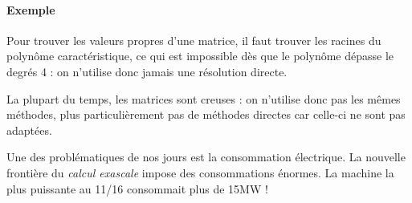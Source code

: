 \documentclass{article}
\begin{document}
\paragraph{Exemple} Pour trouver les valeurs propres d'une matrice, il faut trouver les racines du polynôme caractéristique, ce qui est impossible dès que le polynôme dépasse le degrés 4 : on n'utilise donc jamais une résolution directe.
\bigskip

La plupart du temps, les matrices sont creuses : on n'utilise donc pas les mêmes méthodes, plus particulièrement pas de méthodes directes car celle-ci ne sont pas adaptées.
\bigskip

Une des problématiques de nos jours est la consommation électrique. La nouvelle frontière du \emph{calcul exascale} impose des consommations énormes. La machine la plus puissante au 11/16 consommait plus de 15MW !
\end{document}

